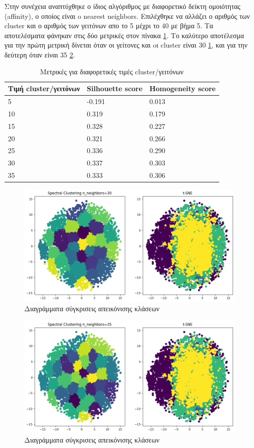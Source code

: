 	Στην συνέχεια αναπτύχθηκε ο ίδιος αλγόριθμος με διαφορετικό δείκτη ομοιότητας (affinity), ο οποίος είναι o nearest neighbors. Επιλέχθηκε να αλλάζει ο αριθμός των cluster και ο αριθμός των γειτόνων απο το 5 μέχρι το 40 με βήμα 5. Τα αποτελέσματα φάνηκαν στις δύο μετρικές στον πίνακα \ref{tab:abc7}. Το καλύτερο αποτέλεσμα για την πρώτη μετρική δίνεται όταν οι γείτονες και oι cluster είναι 30 \ref{f:g15}, και για την δεύτερη όταν είναι 35 \ref{f:g14}.
	
	\begin{table}[ht]
		\centering
		\caption{Μετρικές για διαφορετικές τιμές cluster/γειτόνων}
		\begin{tabular}{l | l | l}
			Τιμή cluster/γειτόνων & Silhouette score &  Homogeneity score\\
			\hline
			5 & -0.191 & 0.013\\
			10 & 0.319 & 0.179\\
			15 & 0.328&0.227\\
			20 & 0.321 & 0.266\\
			25 &0.336 & 0.290\\
			30 & 0.337 & 0.303\\
			35 & 0.333 & 0.306\\
		\end{tabular}

		\label{tab:abc7}
	\end{table}
	\begin{figure}[ht]
		\centering
		\includegraphics[width=1\linewidth]{Imagedata1/n_30tsne1.png}
		\caption{ Διαγράμματα σύγκρισεις απεικόνισης κλάσεων }
		\label{f:g15}	
	\end{figure}
	\begin{figure}[ht]
		\centering
		\includegraphics[width=1\linewidth]{Imagedata1/n_35tsne1.png}
		\caption{ Διαγράμματα σύγκρισεις απεικόνισης κλάσεων }
		\label{f:g14}	
	\end{figure}
	
